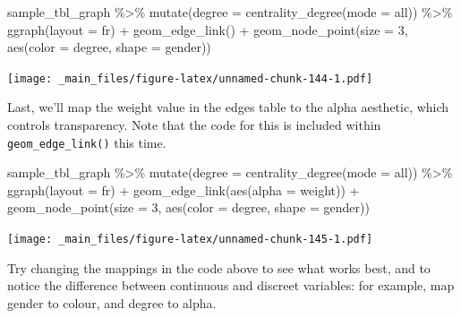 \documentclass[
]{book}
\newenvironment{Shaded}{\begin{snugshade}}{\end{snugshade}}
\newcommand{\AttributeTok}[1]{\textcolor[rgb]{0.77,0.63,0.00}{#1}}
\newcommand{\DecValTok}[1]{\textcolor[rgb]{0.00,0.00,0.81}{#1}}
\newcommand{\FunctionTok}[1]{\textcolor[rgb]{0.00,0.00,0.00}{#1}}
\newcommand{\NormalTok}[1]{#1}
\newcommand{\SpecialCharTok}[1]{\textcolor[rgb]{0.00,0.00,0.00}{#1}}
\newcommand{\StringTok}[1]{\textcolor[rgb]{0.31,0.60,0.02}{#1}}
\begin{document}
\begin{Shaded}
\begin{Highlighting}[]
\NormalTok{sample\_tbl\_graph }\SpecialCharTok{\%\textgreater{}\%} 
  \FunctionTok{mutate}\NormalTok{(}\AttributeTok{degree =} \FunctionTok{centrality\_degree}\NormalTok{(}\AttributeTok{mode =} \StringTok{\textquotesingle{}all\textquotesingle{}}\NormalTok{)) }\SpecialCharTok{\%\textgreater{}\%} 
  \FunctionTok{ggraph}\NormalTok{(}\AttributeTok{layout =} \StringTok{\textquotesingle{}fr\textquotesingle{}}\NormalTok{) }\SpecialCharTok{+} 
  \FunctionTok{geom\_edge\_link}\NormalTok{() }\SpecialCharTok{+} 
  \FunctionTok{geom\_node\_point}\NormalTok{(}\AttributeTok{size =} \DecValTok{3}\NormalTok{, }
                  \FunctionTok{aes}\NormalTok{(}\AttributeTok{color =}\NormalTok{ degree, }\AttributeTok{shape =}\NormalTok{ gender))}
\end{Highlighting}
\end{Shaded}

\texttt{[image: \_main\_files/figure-latex/unnamed-chunk-144-1.pdf]}

Last, we'll map the weight value in the edges table to the alpha aesthetic, which controls transparency. Note that the code for this is included within \texttt{geom\_edge\_link()} this time.

\begin{Shaded}
\begin{Highlighting}[]
\NormalTok{sample\_tbl\_graph }\SpecialCharTok{\%\textgreater{}\%} 
  \FunctionTok{mutate}\NormalTok{(}\AttributeTok{degree =} \FunctionTok{centrality\_degree}\NormalTok{(}\AttributeTok{mode =} \StringTok{\textquotesingle{}all\textquotesingle{}}\NormalTok{)) }\SpecialCharTok{\%\textgreater{}\%} 
  \FunctionTok{ggraph}\NormalTok{(}\AttributeTok{layout =} \StringTok{\textquotesingle{}fr\textquotesingle{}}\NormalTok{) }\SpecialCharTok{+} 
  \FunctionTok{geom\_edge\_link}\NormalTok{(}\FunctionTok{aes}\NormalTok{(}\AttributeTok{alpha =}\NormalTok{ weight)) }\SpecialCharTok{+} 
  \FunctionTok{geom\_node\_point}\NormalTok{(}\AttributeTok{size =} \DecValTok{3}\NormalTok{, }\FunctionTok{aes}\NormalTok{(}\AttributeTok{color =}\NormalTok{ degree, }\AttributeTok{shape =}\NormalTok{ gender))}
\end{Highlighting}
\end{Shaded}

\texttt{[image: \_main\_files/figure-latex/unnamed-chunk-145-1.pdf]}

Try changing the mappings in the code above to see what works best, and to notice the difference between continuous and discreet variables: for example, map gender to colour, and degree to alpha.
\end{document}
